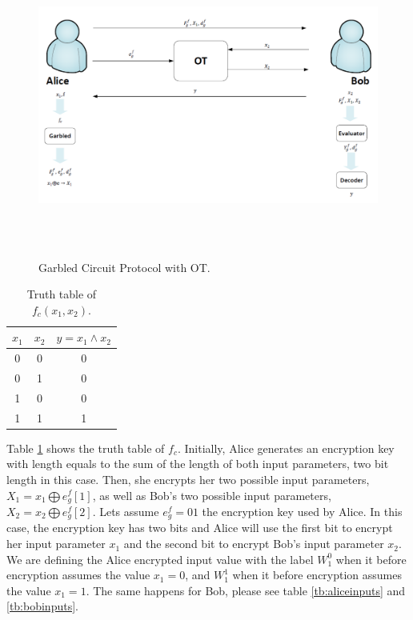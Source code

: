\begin{refsection}
\begin{figure}[H]
	\centering
	\includegraphics[width=1\textwidth, height=10cm]{./sdf/secure_multiparty_computation/figures/smc_with_ot.png}
    \caption{Garbled Circuit Protocol with OT.}\label{fig:smcwithot}
\end{figure}



\begin{table}[H]
\centering
\begin{tabular}{|c|c|c|}
\hline
$x_1$           & $x_2$             & $y=x_1 \wedge x_2$       \\ \hline
0               & 0                 & 0                             \\ \hline
0               & 1                 & 0                             \\ \hline
1               & 0                 & 0                             \\ \hline
1               & 1                 & 1                             \\ \hline
\end{tabular}
\caption{Truth table of $f_c(x_1,x_2)$.}\label{tb:truthtable}
\end{table}

Table \ref{tb:truthtable} shows the truth table of $f_c$. Initially, Alice generates an encryption key with length equals to the sum of the length of both input parameters, two bit length in this case. Then, she encrypts her two possible input parameters, $X_1 = x_1 \bigoplus e_g^f[1]$, as well as Bob's two possible input parameters, $X_2 = x_2 \bigoplus e_g^f[2]$. Lets assume $e_g^f = 01$ the encryption key used by Alice. In this case, the encryption key has two bits and Alice will use the first bit to encrypt her input parameter $x_1$ and the second bit to encrypt Bob's input parameter $x_2$. We are defining the Alice encrypted input value with the label $W_1^0$ when it before encryption assumes the value $x_1 = 0$, and $W_1^1$ when it before encryption assumes the value $x_1 = 1$. The same happens for Bob, please see table \ref{tb:aliceinputs} and \ref{tb:bobinputs}.


\end{refsection}
